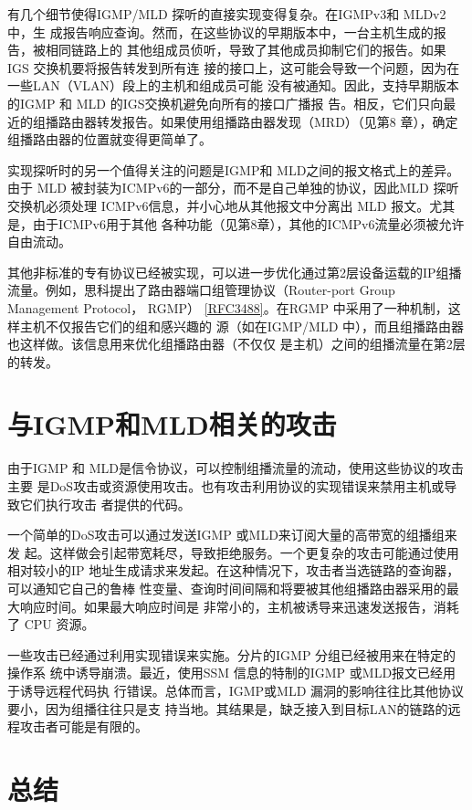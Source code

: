 有几个细节使得IGMP/MLD 探听的直接实现变得复杂。在IGMPv3和 MLDv2中，生
成报告响应查询。然而，在这些协议的早期版本中，一台主机生成的报告，被相同链路上的
其他组成员侦听，导致了其他成员抑制它们的报告。如果IGS 交换机要将报告转发到所有连
接的接口上，这可能会导致一个问题，因为在一些LAN（VLAN）段上的主机和组成员可能
没有被通知。因此，支持早期版本的IGMP 和 MLD 的IGS交换机避免向所有的接口广播报
告。相反，它们只向最近的组播路由器转发报告。如果使用组播路由器发现（MRD）（见第8
章），确定组播路由器的位置就变得更简单了。

实现探听时的另一个值得关注的问题是IGMP和 MLD之间的报文格式上的差异。由于
MLD 被封装为ICMPv6的一部分，而不是自己单独的协议，因此MLD 探听交换机必须处理
ICMPv6信息，并小心地从其他报文中分离出 MLD 报文。尤其是，由于ICMPv6用于其他
各种功能（见第8章），其他的ICMPv6流量必须被允许自由流动。

其他非标准的专有协议已经被实现，可以进一步优化通过第2层设备运载的IP组播
流量。例如，思科提出了路由器端口组管理协议（Router-port Group Management Protocol，
RGMP） \href{https://www.rfc-editor.org/rfc/rfc3488}{[RFC3488]}。在RGMP 中采用了一种机制，这样主机不仅报告它们的组和感兴趣的
源（如在IGMP/MLD 中），而且组播路由器也这样做。该信息用来优化组播路由器（不仅仅
是主机）之间的组播流量在第2层的转发。

\section{与IGMP和MLD相关的攻击}

由于IGMP 和 MLD是信令协议，可以控制组播流量的流动，使用这些协议的攻击主要
是DoS攻击或资源使用攻击。也有攻击利用协议的实现错误来禁用主机或导致它们执行攻击
者提供的代码。

一个简单的DoS攻击可以通过发送IGMP 或MLD来订阅大量的高带宽的组播组来发
起。这样做会引起带宽耗尽，导致拒绝服务。一个更复杂的攻击可能通过使用相对较小的IP
地址生成请求来发起。在这种情况下，攻击者当选链路的查询器，可以通知它自己的鲁棒
性变量、查询时间间隔和将要被其他组播路由器采用的最大响应时间。如果最大响应时间是
非常小的，主机被诱导来迅速发送报告，消耗了 CPU 资源。

一些攻击已经通过利用实现错误来实施。分片的IGMP 分组已经被用来在特定的操作系
统中诱导崩溃。最近，使用SSM 信息的特制的IGMP 或MLD报文已经用于诱导远程代码执
行错误。总体而言，IGMP或MLD 漏洞的影响往往比其他协议要小，因为组播往往只是支
持当地。其结果是，缺乏接入到目标LAN的链路的远程攻击者可能是有限的。

\section{总结}


